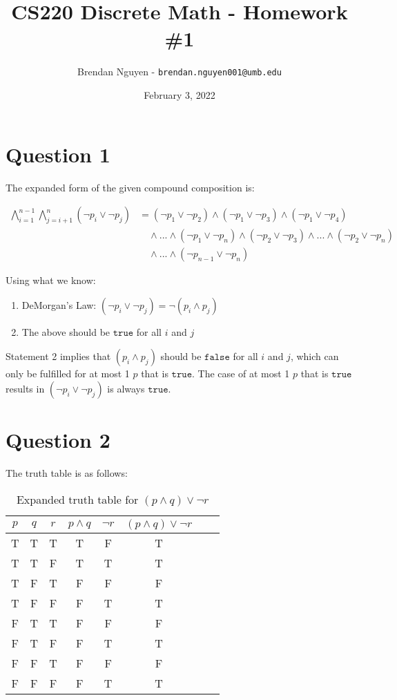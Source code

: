\documentclass[11pt]{article}
\title{CS220 Discrete Math - Homework \#1}
\author{Brendan Nguyen - \texttt{brendan.nguyen001@umb.edu}}
\date{February 3, 2022}
\begin{document}
\maketitle

\section*{Question 1}
The expanded form of the given compound composition is:

\begin{equation*}
    \begin{split}
        \bigwedge_{i=1}^{n-1} \bigwedge_{j=i+1}^n (\neg p_i \vee \neg p_j) &= (\neg p_1 \vee \neg p_2) \wedge (\neg p_1 \vee \neg p_3) \wedge (\neg p_1 \vee \neg p_4)\\
        &\quad\wedge ... \wedge (\neg p_1 \vee \neg p_n) \wedge (\neg p_2 \vee \neg p_3) \wedge ... \wedge (\neg p_2 \vee \neg p_n)\\
        &\quad\wedge ... \wedge (\neg p_{n-1} \vee \neg p_n)
    \end{split}
\end{equation*}
	
Using what we know:

\begin{enumerate}
  \item DeMorgan's Law: $(\neg p_i \vee \neg p_j) = \neg (p_i \wedge p_j)$
  \item The above should be $\texttt{true}$ for all $i$ and $j$
\end{enumerate}

Statement 2 implies that $(p_i \wedge p_j)$ should be $\texttt{false}$ for all $i$ and $j$, which can only be fulfilled for at most 1 $p$ that is $\texttt{true}$. The case of at most 1 $p$ that is $\texttt{true}$ results in $(\neg p_i \vee \neg p_j)$ is always $\texttt{true}$.

\section*{Question 2}

The truth table is as follows:
\begin{table}[H]
\centering
    \begin{tabular}{|c c c|c|c|c|c|c|}
    \hline
    $p$ & $q$ & $r$ & $p \wedge q$ & $\neg r$ & $(p \wedge q) \vee \neg r$ \\ \hline
    T & T & T & T & F & T\\ \hline
    T & T & F & T & T & T\\ \hline
    T & F & T & F & F & F\\ \hline
    T & F & F & F & T & T\\ \hline
    F & T & T & F & F & F\\ \hline
    F & T & F & F & T & T\\ \hline
    F & F & T & F & F & F\\ \hline
    F & F & F & F & T & T\\ \hline
    \end{tabular}
    \caption{Expanded truth table for $(p \wedge q) \vee \neg r$}
    \label{table:1}
\end{table}
\end{document}

